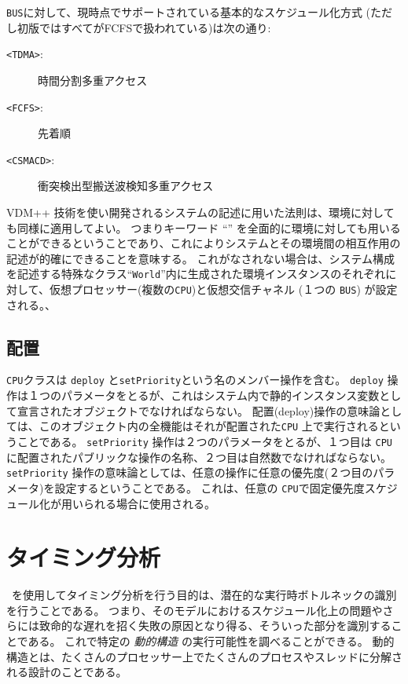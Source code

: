 \documentclass[\pformat,12pt]{jreport}
\begin{document}
\texttt{BUS}に対して、現時点でサポートされている基本的なスケジュール化方式 (ただし初版ではすべてがFCFSで扱われている)は次の通り:
\begin{description}
\item[\texttt{<TDMA>}:] 時間分割多重アクセス
\item[\texttt{<FCFS>}:] 先着順
\item[\texttt{<CSMACD>}:] 衝突検出型搬送波検知多重アクセス
\end{description} 

VDM++ 技術を使い開発されるシステムの記述に用いた法則は、環境に対しても同様に適用してよい。
つまりキーワード ``'' を全面的に環境に対しても用いることができるということであり、これによりシステムとその環境間の相互作用の記述が的確にできることを意味する。
これがなされない場合は、システム構成を記述する特殊なクラス``\texttt{World}''内に生成された環境インスタンスのそれぞれに対して、仮想プロセッサー(複数の\texttt{CPU})と仮想交信チャネル (１つの \texttt{BUS}) が設定される。、

\subsection{配置}

\texttt{CPU}クラスは \texttt{deploy} と\texttt{setPriority}という名のメンバー操作を含む。
 \texttt{deploy} 操作は１つのパラメータをとるが、これはシステム内で静的インスタンス変数として宣言されたオブジェクトでなければならない。
配置(deploy)操作の意味論としては、このオブジェクト内の全機能はそれが配置された\texttt{CPU} 上で実行されるということである。
\texttt{setPriority} 操作は２つのパラメータをとるが、１つ目は \texttt{CPU}に配置されたパブリックな操作の名称、２つ目は自然数でなければならない。
\texttt{setPriority} 操作の意味論としては、任意の操作に任意の優先度(２つ目のパラメータ)を設定するということである。
これは、任意の \texttt{CPU}で固定優先度スケジュール化が用いられる場合に使用される。


\section{タイミング分析}\label{sec:timingintro}

 \VDMTools\ を使用してタイミング分析を行う目的は、潜在的な実行時ボトルネックの識別を行うことである。
つまり、そのモデルにおけるスケジュール化上の問題やさらには致命的な遅れを招く失敗の原因となり得る、そういった部分を識別することである。
これで特定の \emph{動的構造} の実行可能性を調べることができる。
動的構造とは、たくさんのプロセッサー上でたくさんのプロセスやスレッドに分解される設計のことである。
\end{document}

